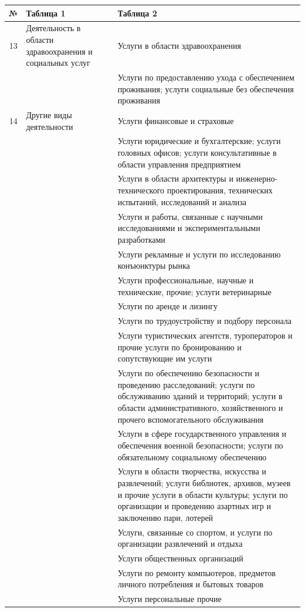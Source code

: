 \documentclass[12pt, a4paper]{article}
\begin{document}
\begin{tabular}[t]{|c|p{6cm}|p{9cm}|}
\hline
	№ & Таблица 1 & Таблица 2\\
\hline
13 & Деятельность в области здравоохранения и социальных услуг & Услуги в области здравоохранения\\ \cline{3-3}
&& Услуги по предоставлению ухода с обеспечением проживания; услуги социальные без обеспечения проживания \\ \cline{1-3}
14 & Другие виды деятельности & Услуги финансовые и страховые\\ \cline{3-3}
&& Услуги юридические и бухгалтерские; услуги головных офисов; услуги консультативные в области управления предприятием \\ \cline{3-3}
&& Услуги в области архитектуры и инженерно-технического проектирования, технических испытаний, исследований и анализа\\ \cline{3-3}
&&Услуги и работы, связанные с научными исследованиями и экспериментальными разработками \\ \cline{3-3}
&& Услуги рекламные и услуги по исследованию конъюнктуры рынка \\ \cline{3-3}
&& Услуги профессиональные, научные и технические, прочие; услуги ветеринарные \\ \cline{3-3}
&& Услуги по аренде и лизингу \\ \cline{3-3}
&& Услуги по трудоустройству и подбору персонала \\ \cline{3-3}
&& Услуги туристических агентств, туроператоров и прочие услуги по бронированию и сопутствующие им услуги \\ \cline{3-3}
&& Услуги по обеспечению безопасности и проведению расследований; услуги по обслуживанию зданий и территорий; услуги в области административного, хозяйственного и прочего вспомогательного обслуживания \\ \cline{3-3}
&& Услуги в сфере государственного управления и обеспечения военной безопасности; услуги по обязательному социальному обеспечению \\ \cline{3-3}
&&Услуги в области творчества, искусства и развлечений; услуги библиотек, архивов, музеев и прочие услуги в области культуры; услуги по организации и проведению азартных игр и заключению пари, лотерей \\ \cline{3-3}
&& Услуги, связанные со спортом, и услуги по организации развлечений и отдыха \\ \cline{3-3}
&& Услуги общественных организаций \\ \cline{3-3}
&& Услуги по ремонту компьютеров, предметов личного потребления и бытовых товаров \\ \cline{3-3}
&& Услуги персональные прочие \\ \cline{1-3}

\end{tabular}
\end{document}
